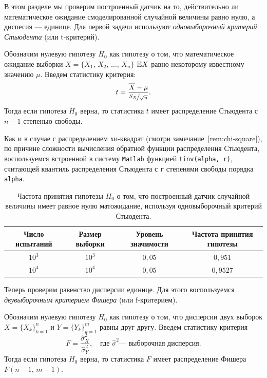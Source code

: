 В этом разделе мы проверим построенный датчик на то, действительно ли математическое ожидание смоделированной случайной величины равно нулю, а диспесия --- единице. Для первой задачи используют \textit{одновыборочный критерий Стьюдента} (или t-критерий). 

\begin{theorem}
        Обозначим нулевую гипотезу $H_0$ как гипотезу о том, что математическое ожидание выборки $X = \{X_1,\,X_2,\,\ldots,\,X_n\}$ $\mathbb{E} X$ равно некоторому известному значению $\mu$. Введем статистику критерия:
$$
        t = \frac{\overline{X} - \mu}{\nicefrac{S_X}{\sqrt{n}}}.
$$
        Тогда если гипотеза $H_0$ верна, то статистика $t$ имеет распределение Стьюдента с $n-1$ степенью свободы.
\end{theorem}
\begin{remark}
        Как и в случае с распределением хи-квадрат (смотри замечание~\ref{rem:chi-square}), по причине сложности вычисления обратной функции распределения Стьюдента, воспользуемся встроенной в систему \texttt{Matlab} функцией \texttt{tinv(alpha, r)}, считающей квантиль распределения Стьюдента с \texttt{r} степенями свободы порядка \texttt{alpha}.
\end{remark}

\begin{table}[h]
\begin{center}
\begin{tabular}{|c|c|c|c|}
\hline
Число испытаний &
Размер выборки  &
Уровень значимости &
Частота принятия гипотезы
\\
\hline
$10^3$
&
$10^3$
&
$0,05$
&
$0,951$
\\
\hline
$10^4$
&
$10^4$
&
$0,05$
&
$0,9527$
\\
\hline
\end{tabular}
\end{center}
\caption{Частота принятия гипотезы $H_0$ о том, что построенный датчик случайной величины имеет равное нулю матожидание, используя одновыборочный критерий Стьюдента.}
\end{table}

Теперь проверим равенство дисперсии единице. Для этого воспользуемся \textit{двувыборочным критерием Фишера} (или f-критерием).
\begin{theorem}
        Обозначим нулевую гипотезу $H_0$ как гипотезу о том, что дисперсии двух выборок $X = \{X_k\}_{k=1}^n$ и $Y = \{Y_k\}_{k=1}^m$ равны друг другу. Введем статистику критерия
$$
        F = \frac{\hat \sigma_X^2}{\hat\sigma_Y^2},
        \quad
        \mbox{где }
        \hat\sigma^2
        \mbox{--- выборочная дисперсия}.
$$
        Тогда если гипотеза $H_0$ верна, то статистика $F$ имеет распределение Фишера $F(n-1,\,m-1)$.
\end{theorem}

